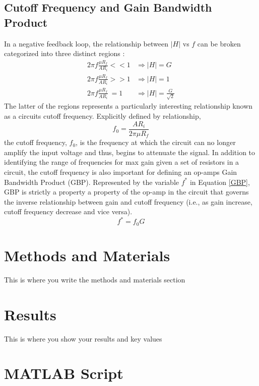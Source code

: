 \documentclass[letterpaper,12pt]{article}
\begin{document}
\subsection{Cutoff Frequency and Gain Bandwidth Product}
In a negative feedback loop, the relationship between $|H|$ vs $f$ can be broken categorized into three distinct regions :
\begin{align*}
    2 \pi f \frac{\mu R_f}{A R_i} << 1 &  \Rightarrow |H| = G \\
    2 \pi f \frac{\mu R_f}{A R_i} >> 1 &  \Rightarrow |H| = 1 \\
    2 \pi f \frac{\mu R_f}{A R_i} \ =1 &  \Rightarrow |H| = \frac{G}{\sqrt{2}}
\end{align*}
The latter of the regions represents a particularly interesting relationship known as a circuits cutoff frequency. Explicitly defined by relationship,
\begin{equation}
    \label{cutoff}
    f_0 = \frac{A R_i}{2\pi \mu R_f}
\end{equation}
the cutoff frequency, $f_0$, is the frequency at which the circuit can no longer amplify the input voltage and thus, begins to attenuate the signal. In addition to identifying the range of frequencies for max gain given a set of resistors in a circuit, the cutoff frequency is also important for defining an op-amps Gain Bandwidth Product (GBP). Represented by the variable $f^*$ in Equation \ref{GBP}, GBP is strictly a property a property of the op-amp in the circuit that governs the inverse relationship between gain and cutoff frequency (i.e., as gain increase, cutoff frequency decrease and vice versa).
\begin{equation}
    \label{GBP}
    f^* = f_0G
\end{equation}

\section{Methods and Materials}
This is where you write the methods and materials section


\section{Results}
This is where you show your results and key values

\newpage
\appendix
\section{MATLAB Script}

\end{document}
